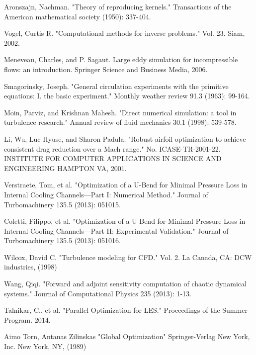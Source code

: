 \documentclass[a4paper,onecolumn]{article}
\theoremstyle{remark}
\begin{document}
\begin{thebibliography}{9}
Aronszajn, Nachman. 
"Theory of reproducing kernels." 
Transactions of the American mathematical society (1950): 337-404.

Vogel, Curtis R. 
"Computational methods for inverse problems."
Vol. 23. Siam, 2002.

Meneveau, Charles, and P. Sagaut. 
Large eddy simulation for incompressible flows: an introduction.
Springer Science and Business Media, 2006.

Smagorinsky, Joseph. 
"General circulation experiments with the primitive equations: I. the basic experiment." 
Monthly weather review 91.3 (1963): 99-164.

Moin, Parviz, and Krishnan Mahesh. 
"Direct numerical simulation: a tool in turbulence research." 
Annual review of fluid mechanics 30.1 (1998): 539-578.

Li, Wu, Luc Hyuse, and Sharon Padula. 
"Robust airfoil optimization to achieve consistent drag reduction over a Mach range."
No. ICASE-TR-2001-22. INSTITUTE FOR COMPUTER APPLICATIONS IN SCIENCE AND ENGINEERING HAMPTON VA, 2001.

Verstraete, Tom, et al. 
"Optimization of a U-Bend for Minimal Pressure Loss in Internal Cooling Channels—Part I: Numerical Method." 
Journal of Turbomachinery 135.5 (2013): 051015.

Coletti, Filippo, et al. 
"Optimization of a U-Bend for Minimal Pressure Loss in Internal Cooling Channels—Part II: Experimental Validation." 
Journal of Turbomachinery 135.5 (2013): 051016.

Wilcox, David C. 
"Turbulence modeling for CFD." 
Vol. 2. La Canada, CA: DCW industries, (1998)

Wang, Qiqi. 
"Forward and adjoint sensitivity computation of chaotic dynamical systems." 
Journal of Computational Physics 235 (2013): 1-13.

Talnikar, C., et al. "Parallel Optimization for LES." Proceedings of the Summer Program. 2014.

Aimo Torn, Antanas Zilinskas
"Global Optimization"
Springer-Verlag New York, Inc. New York, NY, (1989)


\end{thebibliography}
\end{document}
